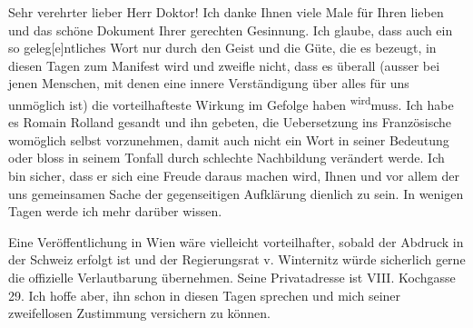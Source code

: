 \pstart\center{}Sehr verehrter lieber Herr Doktor!\pend\vspace{0.5em}
\pstart
           Ich danke Ihnen viele Mal\introOben{}e\introOben{} für Ihren lieben \label{K_L03683-1v}\label{K_L03683-1} und das schöne Dokument Ihrer gerechten
               Gesinnung. Ich glaube, dass auch ein so geleg{[}e{]}ntliches Wort nur
               durch den Geist und die Güte, die es bezeugt, in diesen Tagen zum Manifest wird und
               zweifle nicht, dass es überall (ausser bei jenen Menschen, mit denen eine innere
               Verständigung über alles für uns unmöglich ist) die vorteilhafteste Wirkung im
               Gefolge haben \substVorne{}\textsuperscript{wird}\substDazwischen{}muss\substHinten{}. Ich habe es Romain Rolland gesandt
               und ihn gebeten, die Uebersetzung ins Französische womöglich selbst vorzunehmen, damit auch nicht ein Wort in
               seiner Bedeutung oder bloss \introOben{}in\introOben{} seinem Tonfall durch
               schlechte Nachbildung verändert werde. Ich bin sicher, dass er sich eine Freude
               daraus machen wird\introOben{},\introOben{} Ihnen und vor allem der uns gemeinsamen
               Sache der gegenseitigen Aufklärung dienlich zu sein. In wenigen Tagen werde ich mehr
               darüber wissen.\pend
           
\pstart
           Eine Veröffentlichung in Wien wäre vielleicht
               vorteilhafter, sobald der Abdruck in der Schweiz erfolgt ist und
               der Regierungsrat v. Winternitz würde
               sicherlich gerne die offizielle Verlautbarung übernehmen. Seine Privatadresse ist VIII. Kochgasse 29. Ich hoffe aber, ihn schon
               in diesen Tagen sprechen und mich seiner zweifellosen Zustimmung versichern zu
               können.\pend
           
